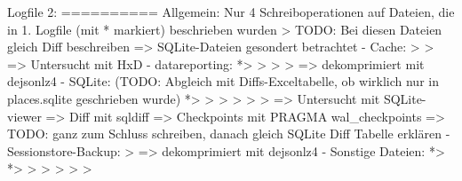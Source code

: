 Logfile 2:
==========
Allgemein: Nur 4 Schreiboperationen auf Dateien, die in 1. Logfile (mit * markiert) beschrieben wurden
> TODO: Bei diesen Dateien gleich Diff beschreiben => SQLite-Dateien gesondert betrachtet
- Cache: 
	> %
	> %
		=> Untersucht mit HxD
- datareporting:
	*> %
	> %
	> %
	> %
		=> dekomprimiert mit dejsonlz4
- SQLite: (TODO: Abgleich mit Diffs-Exceltabelle, ob wirklich nur in places.sqlite geschrieben wurde)
	*> %
	> %
	> %
	> %
	> %
	> %
		=> Untersucht mit SQLite-viewer
		=> Diff mit sqldiff
		=> Checkpoints mit PRAGMA wal\_checkpoints
		=> TODO: ganz zum Schluss schreiben, danach gleich SQLite Diff Tabelle erklären
- Sessionstore-Backup:
	> %
		=> dekomprimiert mit dejsonlz4
- Sonstige Dateien:
	*> %
	*> %
	> %
	> %
	> %
	> %
	> %
		

